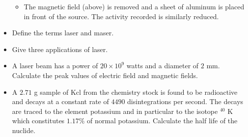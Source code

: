 \documentclass{article}
\begin{document}
\begin{itemize}
\begin{itemize}
\item The magnetic field (above) is removed and a sheet of aluminum is placed in front of the source. The activity recorded is similarly reduced.
\end{itemize}
\item Define the terms laser and maser. 
\item Give three applications of laser. 
\item A laser beam has a power of $ 20 \times 10^{9}$ watts and a diameter of $ 2$ mm.  Calculate the peak values of electric field and magnetic fields.
\item A $ 2.71$ g sample of Kcl from the chemistry stock is found to be radioactive and decays at a constant rate of $ 4490$ disintegrations per second.  The decays are traced to the element potassium and in particular to the isotope $ ^{40}$ K which constitutes $ 1.17\%$ of normal potassium.  Calculate the half life of the nuclide.
\end{itemize}
\end{document}
